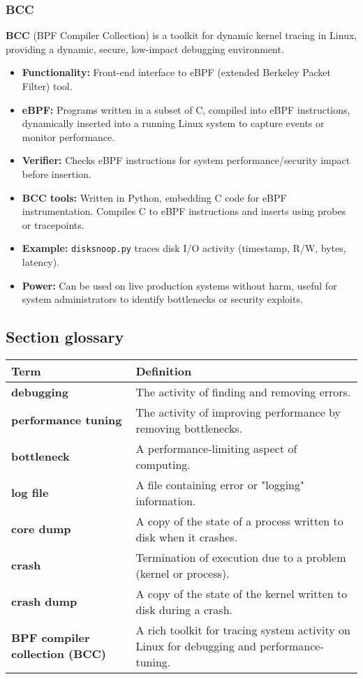 \subsubsection*{BCC}
\textbf{BCC} (BPF Compiler Collection) is a toolkit for dynamic kernel tracing in Linux, providing a dynamic, secure, low-impact debugging environment.
\begin{itemize}
    \item \textbf{Functionality:} Front-end interface to eBPF (extended Berkeley Packet Filter) tool.
    \item \textbf{eBPF:} Programs written in a subset of C, compiled into eBPF instructions, dynamically inserted into a running Linux system to capture events or monitor performance.
    \item \textbf{Verifier:} Checks eBPF instructions for system performance/security impact before insertion.
    \item \textbf{BCC tools:} Written in Python, embedding C code for eBPF instrumentation. Compiles C to eBPF instructions and inserts using probes or tracepoints.
    \item \textbf{Example:} \texttt{disksnoop.py} traces disk I/O activity (timestamp, R/W, bytes, latency).
    \item \textbf{Power:} Can be used on live production systems without harm, useful for system administrators to identify bottlenecks or security exploits.
\end{itemize}

\subsection*{Section glossary}

\begin{tabular}{>{\raggedright}p{} >{\raggedright\arraybackslash}p{}}
\toprule
\textbf{Term} & \textbf{Definition} \\
\midrule
\textbf{debugging} & The activity of finding and removing errors. \\
\textbf{performance tuning} & The activity of improving performance by removing bottlenecks. \\
\textbf{bottleneck} & A performance-limiting aspect of computing. \\
\textbf{log file} & A file containing error or "logging" information. \\
\textbf{core dump} & A copy of the state of a process written to disk when it crashes. \\
\textbf{crash} & Termination of execution due to a problem (kernel or process). \\
\textbf{crash dump} & A copy of the state of the kernel written to disk during a crash. \\
\textbf{BPF compiler collection (BCC)} & A rich toolkit for tracing system activity on Linux for debugging and performance-tuning. \\
\bottomrule
\end{tabular}
\vspace{\baselineskip}
